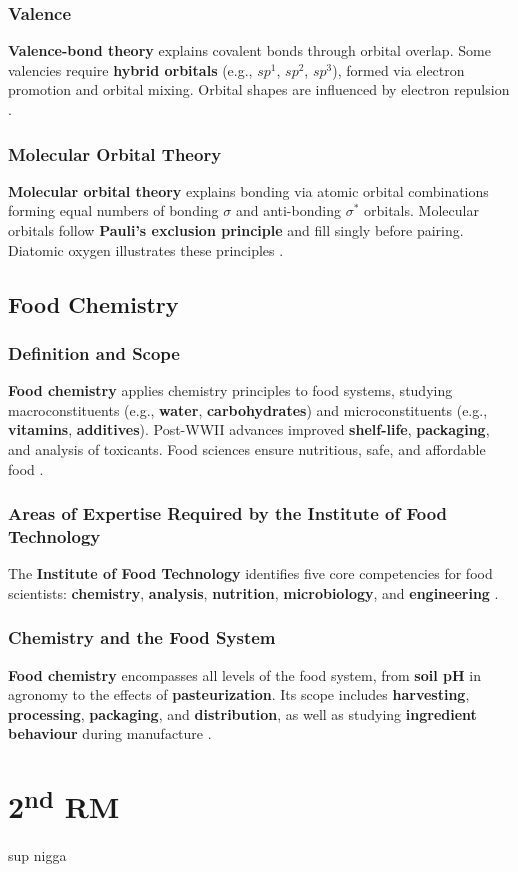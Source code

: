 \subsubsection*{Valence}
\textbf{Valence-bond theory} explains covalent bonds through orbital overlap. Some valencies require \textbf{hybrid orbitals} (e.g., \textbf{$sp^1$}, \textbf{$sp^2$}, \textbf{$sp^3$}), formed via electron promotion and orbital mixing. Orbital shapes are influenced by electron repulsion \cite*{BKR_01}.

\subsubsection*{Molecular Orbital Theory}
\textbf{Molecular orbital theory} explains bonding via atomic orbital combinations forming equal numbers of bonding $\sigma$ and anti-bonding $\sigma^*$ orbitals. Molecular orbitals follow \textbf{Pauli's exclusion principle} and fill singly before pairing. Diatomic oxygen illustrates these principles \cite*{BKR_01}.

\subsection*{Food Chemistry}
\subsubsection*{Definition and Scope}
\textbf{Food chemistry} applies chemistry principles to food systems, studying macroconstituents (e.g., \textbf{water}, \textbf{carbohydrates}) and microconstituents (e.g., \textbf{vitamins}, \textbf{additives}). Post-WWII advances improved \textbf{shelf-life}, \textbf{packaging}, and analysis of toxicants. Food sciences ensure nutritious, safe, and affordable food \cite*{BKR_01}.

\subsubsection*{Areas of Expertise Required by the Institute of Food Technology}
The \textbf{Institute of Food Technology} identifies five core competencies for food scientists: \textbf{chemistry}, \textbf{analysis}, \textbf{nutrition}, \textbf{microbiology}, and \textbf{engineering} \cite*{BKR_01}.

\subsubsection*{Chemistry and the Food System}
\textbf{Food chemistry} encompasses all levels of the food system, from \textbf{soil pH} in agronomy to the effects of \textbf{pasteurization}. Its scope includes \textbf{harvesting}, \textbf{processing}, \textbf{packaging}, and \textbf{distribution}, as well as studying \textbf{ingredient behaviour} during manufacture \cite*{BKR_01}.

\section{2\texorpdfstring{\textsuperscript{nd}}{nd} RM}
sup nigga
